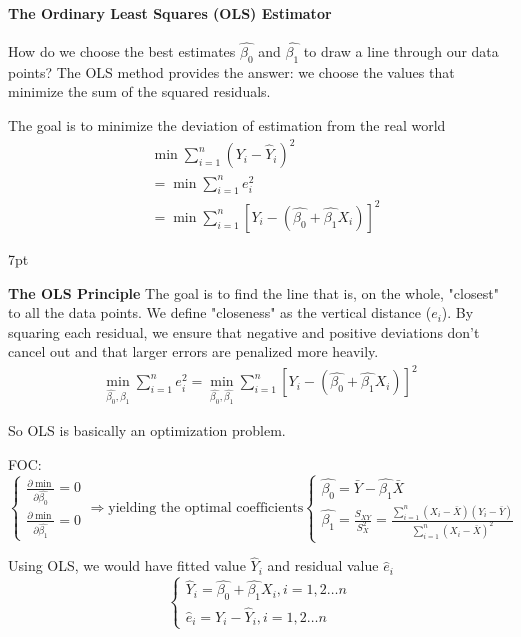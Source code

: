\documentclass{article}
\newenvironment{greenblock}{%
\def\FrameCommand{%
  \hspace{1pt}%
    {\color{Green}%
    \vrule width 2pt}%
    {\color{greenshade}%
    \vrule width 4pt}%
  \colorbox{greenshade}%
}%
\MakeFramed{%
  \advance%
  \hsize-%
  \width%
  \FrameRestore}%
\noindent\hspace{-4.55pt}%
\begin{adjustwidth}{}{7pt}%
\vspace{2pt}\vspace{2pt}%
}
{%
\vspace{2pt}\end{adjustwidth}\endMakeFramed%
}
\begin{document}
\paragraph{The Ordinary Least Squares (OLS) Estimator}

How do we choose the best estimates $\hat{\beta_0}$ and $\hat{\beta_1}$ to draw a line through our data points? The OLS method provides the answer: we choose the values that minimize the sum of the squared residuals.

The goal is to minimize the deviation of estimation from the real world
\begin{align}
  & \min \sum\limits_{i=1}^n (Y_i-\hat Y_i)^2
  \\& =\min \sum\limits_{i=1}^n e_i^2
  \\& =\min \sum\limits_{i=1}^n [Y_i-(\hat{\beta_{0}}+\hat{\beta_{1}}X_i)]^2
\end{align}

\begin{greenblock}
\textbf{The OLS Principle}
The goal is to find the line that is, on the whole, "closest" to all the data points. We define "closeness" as the vertical distance ($e_i$). By squaring each residual, we ensure that negative and positive deviations don't cancel out and that larger errors are penalized more heavily.
\begin{align}
  \min_{\hat{\beta_0}, \hat{\beta_1}} \sum\limits_{i=1}^n e_i^2 = \min_{\hat{\beta_0}, \hat{\beta_1}} \sum\limits_{i=1}^n [Y_i-(\hat{\beta_{0}}+\hat{\beta_{1}}X_i)]^2
\end{align}
\end{greenblock}

So OLS is basically an optimization problem.

FOC:
$\begin{cases}
\frac{\partial \min}{\partial \hat{\beta_{0}}}=0
\\
\frac{\partial \min}{\partial \hat{\beta_{1}}}=0
\end{cases} \Rightarrow
\text{yielding the optimal coefficients}
\begin{cases}
\hat{\beta_{0}}=\bar Y-\hat{\beta_{1}}\bar X
\\
\hat{\beta_{1}}=\frac{S_{XY}}{S^2_X}=\frac{\sum\limits_{i=1}^n (X_i-\bar X)(Y_i-\bar Y)}{\sum\limits_{i=1}^n (X_i-\bar X)^2}
\end{cases}$


Using OLS, we would have fitted value $\hat Y_i$ and residual value $\hat e_i$
\begin{equation}
  \begin{cases}
    \hat Y_i=\hat{\beta_{0}}+\hat{\beta_{1}}X_i,i=1,2\dots n
    \\
    \hat e_i=Y_i-\hat Y_i,i=1,2\dots n
  \end{cases}
\end{equation}
\end{document}
